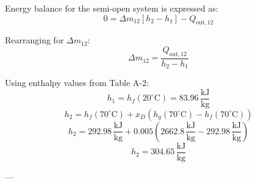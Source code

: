 Energy balance for the semi-open system is expressed as:  
\[
0 = \Delta m_{12} \left[ h_2 - h_1 \right] - Q_{\text{out},12}
\]

Rearranging for \( \Delta m_{12} \):  
\[
\Delta m_{12} = \frac{Q_{\text{out},12}}{h_2 - h_1}
\]

Using enthalpy values from Table A-2:  
\[
h_1 = h_f(20^\circ\text{C}) = 83.96 \, \frac{\text{kJ}}{\text{kg}}
\]  
\[
h_2 = h_f(70^\circ\text{C}) + x_D \left( h_g(70^\circ\text{C}) - h_f(70^\circ\text{C}) \right)
\]  
\[
h_2 = 292.98 \, \frac{\text{kJ}}{\text{kg}} + 0.005 \left( 2662.8 \, \frac{\text{kJ}}{\text{kg}} - 292.98 \, \frac{\text{kJ}}{\text{kg}} \right)
\]  
\[
h_2 = 304.65 \, \frac{\text{kJ}}{\text{kg}}
\]

---
